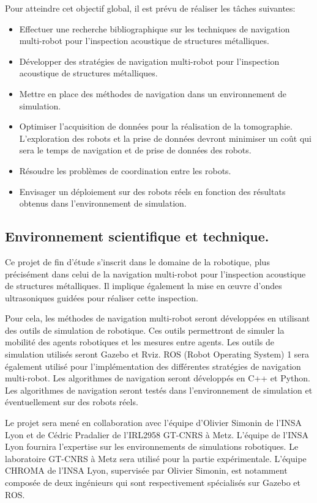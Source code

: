 \documentclass[init,francais,RandD]{rapportPFE}  %
\begin{document}
			Pour atteindre cet objectif global, il est prévu de réaliser les tâches suivantes:
			\begin{itemize}
				\item Effectuer une recherche bibliographique sur les techniques de navigation multi-robot pour l'inspection acoustique de structures métalliques.
				\item Développer des stratégies de navigation multi-robot pour l'inspection acoustique de structures métalliques.
				\item Mettre en place des méthodes de navigation dans un environnement de simulation.
				\item Optimiser l'acquisition de données pour la réalisation de la tomographie. L'exploration des robots et la prise de données devront minimiser un coût qui sera le temps de navigation et de prise de données des robots.
				\item Résoudre les problèmes de coordination entre les robots.
				\item Envisager un déploiement sur des robots réels en fonction des résultats obtenus dans l'environnement de simulation.
			\end{itemize}
		\subsection{Environnement scientifique et technique.}
			Ce projet de fin d'étude s'inscrit dans le domaine de la robotique, plus précisément dans celui de la navigation multi-robot pour l'inspection acoustique de structures métalliques. Il implique également la mise en œuvre d'ondes ultrasoniques guidées pour réaliser cette inspection.

			Pour cela, les méthodes de navigation multi-robot seront développées en utilisant des outils de simulation de robotique. Ces outils permettront de simuler la mobilité des agents robotiques et les mesures entre agents. Les outils de simulation utilisés seront Gazebo et Rviz. ROS (Robot Operating System) 1 sera également utilisé pour l'implémentation des différentes stratégies de navigation multi-robot. Les algorithmes de navigation seront développés en C++ et Python. Les algorithmes de navigation seront testés dans l'environnement de simulation et éventuellement sur des robots réels.

			Le projet sera mené en collaboration avec l'équipe d'Olivier Simonin de l'INSA Lyon et de Cédric Pradalier de l'IRL2958 GT-CNRS à Metz. L'équipe de l'INSA Lyon fournira l'expertise sur les environnements de simulations robotiques. Le laboratoire GT-CNRS à Metz sera utilisé pour la partie expérimentale. L'équipe CHROMA de l'INSA Lyon, supervisée par Olivier Simonin, est notamment composée de deux ingénieurs qui sont respectivement spécialisés sur Gazebo et ROS.
\end{document}
